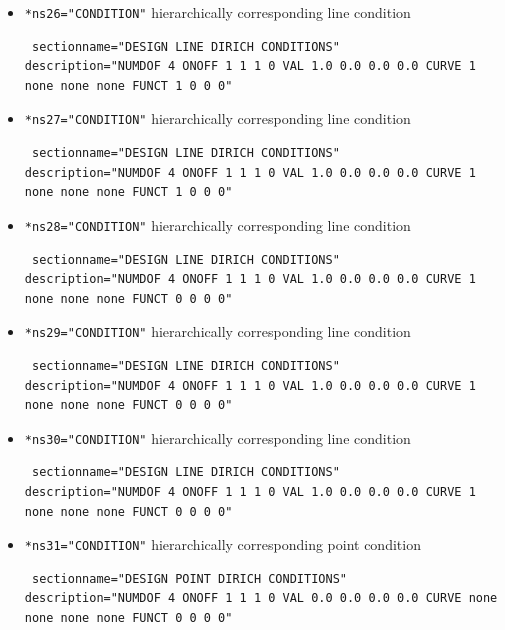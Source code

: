 \begin{itemize}
 \item \verb|*ns26="CONDITION"| \qquad hierarchically corresponding line condition
\begin{small} \begin{verbatim} sectionname="DESIGN LINE DIRICH CONDITIONS"
description="NUMDOF 4 ONOFF 1 1 1 0 VAL 1.0 0.0 0.0 0.0 CURVE 1 none none none FUNCT 1 0 0 0"
\end{verbatim} \end{small}

 \item \verb|*ns27="CONDITION"| \qquad hierarchically corresponding line condition
\begin{small} \begin{verbatim} sectionname="DESIGN LINE DIRICH CONDITIONS"
description="NUMDOF 4 ONOFF 1 1 1 0 VAL 1.0 0.0 0.0 0.0 CURVE 1 none none none FUNCT 1 0 0 0"
\end{verbatim} \end{small}

 \item \verb|*ns28="CONDITION"| \qquad hierarchically corresponding line condition
\begin{small} \begin{verbatim} sectionname="DESIGN LINE DIRICH CONDITIONS"
description="NUMDOF 4 ONOFF 1 1 1 0 VAL 1.0 0.0 0.0 0.0 CURVE 1 none none none FUNCT 0 0 0 0"
\end{verbatim} \end{small}

 \item \verb|*ns29="CONDITION"| \qquad hierarchically corresponding line condition
\begin{small} \begin{verbatim} sectionname="DESIGN LINE DIRICH CONDITIONS"
description="NUMDOF 4 ONOFF 1 1 1 0 VAL 1.0 0.0 0.0 0.0 CURVE 1 none none none FUNCT 0 0 0 0"
\end{verbatim} \end{small}

\item \verb|*ns30="CONDITION"| \qquad hierarchically corresponding line condition
\begin{small} \begin{verbatim} sectionname="DESIGN LINE DIRICH CONDITIONS"
description="NUMDOF 4 ONOFF 1 1 1 0 VAL 1.0 0.0 0.0 0.0 CURVE 1 none none none FUNCT 0 0 0 0"
\end{verbatim} \end{small}

\item \verb|*ns31="CONDITION"| \qquad hierarchically corresponding point condition
\begin{small} \begin{verbatim} sectionname="DESIGN POINT DIRICH CONDITIONS"
description="NUMDOF 4 ONOFF 1 1 1 0 VAL 0.0 0.0 0.0 0.0 CURVE none none none none FUNCT 0 0 0 0"
\end{verbatim} \end{small}


\end{itemize}
